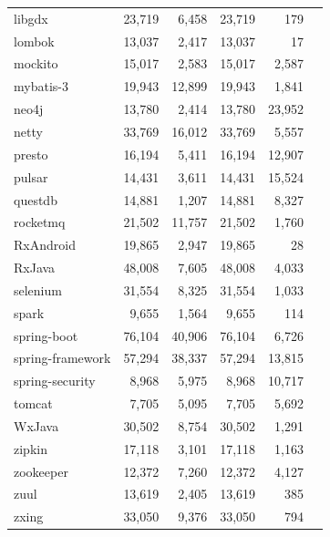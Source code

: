 \begin{table}[ht!]
{\begin{tabular}{lrrrrr}
libgdx & 23,719 & 6,458 & 23,719 & 179 \\
lombok & 13,037 & 2,417 & 13,037 & 17 \\
mockito & 15,017 & 2,583 & 15,017 & 2,587 \\
mybatis-3 & 19,943 & 12,899 & 19,943 & 1,841 \\
neo4j & 13,780 & 2,414 & 13,780 & 23,952 \\
netty & 33,769 & 16,012 & 33,769 & 5,557 \\
presto & 16,194 & 5,411 & 16,194 & 12,907 \\
pulsar & 14,431 & 3,611 & 14,431 & 15,524 \\
questdb & 14,881 & 1,207 & 14,881 & 8,327 \\
rocketmq & 21,502 & 11,757 & 21,502 & 1,760 \\
RxAndroid & 19,865 & 2,947 & 19,865 & 28 \\
RxJava & 48,008 & 7,605 & 48,008 & 4,033 \\
selenium & 31,554 & 8,325 & 31,554 & 1,033 \\
spark & 9,655 & 1,564 & 9,655 & 114 \\
spring-boot & 76,104 & 40,906 & 76,104 & 6,726 \\
spring-framework & 57,294 & 38,337 & 57,294 & 13,815 \\
spring-security & 8,968 & 5,975 & 8,968 & 10,717 \\
tomcat & 7,705 & 5,095 & 7,705 & 5,692 \\
WxJava & 30,502 & 8,754 & 30,502 & 1,291 \\
zipkin & 17,118 & 3,101 & 17,118 & 1,163 \\
zookeeper & 12,372 & 7,260 & 12,372 & 4,127 \\
zuul & 13,619 & 2,405 & 13,619 & 385 \\
zxing & 33,050 & 9,376 & 33,050 & 794 \\
\bottomrule
\end{tabular}
}
\end{table}